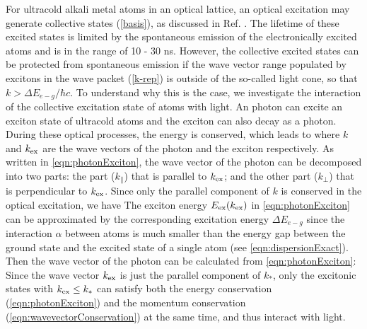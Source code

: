 For ultracold alkali metal atoms in an optical lattice, an optical excitation may generate collective states (\ref{basis}),
as discussed in Ref. \cite{electronic-exciton1, electronic-exciton2}. The lifetime of these excited states is limited by the spontaneous emission of the electronically excited atoms and is
in the range of 10 - 30 ns.
However, the collective excited states can be protected from spontaneous emission if the wave vector range populated by excitons in the wave packet (\ref{k-rep}) is
outside of the so-called light cone, so that $k >\Delta E_{e-g}/\hbar c$.  To understand why this is the case, we 
investigate the interaction of the collective excitation state of atoms with light. An photon can excite an exciton
 state of ultracold atoms and the exciton can also decay as a photon. 
During these optical processes,  the energy is conserved, which leads to 
where $k$ and $k_{\rm ex}$ are the wave vectors of the photon and the exciton respectively. As written in
 \autoref{eqn:photonExciton}, the wave vector of the photon can be decomposed into two parts: the part 
($k_{\parallel}$) that is parallel to $k_{\rm ex}$; and the other part ($k_{\perp}$) that is perpendicular to
 $k_{\rm ex}$. Since only the parallel component of $k$ is conserved in the optical excitation, we have
The exciton energy $E_{\rm ex}(k_{\rm ex})$ in \autoref{eqn:photonExciton} can be approximated by the
 corresponding excitation energy $ \Delta E_{e-g}$ since the interaction $\alpha$ between atoms is much smaller
 than the energy gap between the ground state and the excited state of a single atom 
(see \autoref{eqn:dispersionExact}). Then the wave vector of the photon can be calculated from \autoref{eqn:photonExciton}:
Since the wave vector $k_{\rm ex}$ is just the parallel component of $k_{*}$, only the excitonic states with 
$k_{\rm ex} \leq k_*$  can satisfy both the energy conservation (\autoref{eqn:photonExciton}) and the momentum
 conservation (\autoref{eqn:wavevectorConservation}) at the same time, and thus interact with light. 
